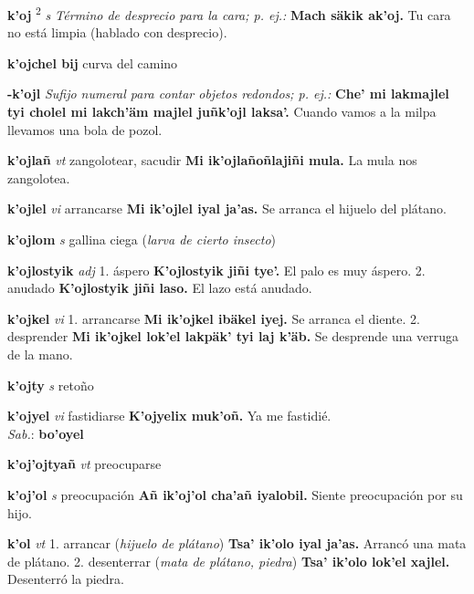 \documentclass[10pt]{scrbook}
\newcommand{\entry}[1]{\textbf{#1}}
\newcommand{\onedefinition}[1]{#1.}
\newcommand{\defsuperscript}[1]{\textsuperscript{#1}}
\newcommand{\nontranslationdef}[1]{\textit{#1}}
\newcommand{\partofspeech}[1]{\textit{#1}}
\newcommand{\spanishtranslation}[1]{#1}
\newcommand{\clarification}[1]{(\textit{#1})}
\newcommand{\cholexample}[1]{\textbf{#1}}
\newcommand{\exampletranslation}[1]{#1}
\newcommand{\dialectvariant}[1]{\\\textit{#1}:}
\newcommand{\dialectword}[1]{\textbf{#1}}
\begin{document}
\begin{multicols}{2}
\entry{k'oj}
\defsuperscript{2}
\partofspeech{s}
\nontranslationdef{Término de desprecio para la cara; p. ej.:}
\cholexample{Mach säkik ak'oj.}
\exampletranslation{Tu cara no está limpia (hablado con desprecio).}

\entry{k'ojchel bij}
\spanishtranslation{curva del camino}

\entry{-k'ojl}
\nontranslationdef{Sufijo numeral para contar objetos redondos; p. ej.:}
\cholexample{Che' mi lakmajlel tyi cholel mi lakch'äm majlel juñk'ojl laksa'.}
\exampletranslation{Cuando vamos a la milpa llevamos una bola de pozol.}

\entry{k'ojlañ}
\partofspeech{vt}
\spanishtranslation{zangolotear, sacudir}
\cholexample{Mi ik'ojlañoñlajiñi mula.}
\exampletranslation{La mula nos zangolotea.}

\entry{k'ojlel}
\partofspeech{vi}
\spanishtranslation{arrancarse}
\cholexample{Mi ik'ojlel iyal ja'as.}
\exampletranslation{Se arranca el hijuelo del plátano.}

\entry{k'ojlom}
\partofspeech{s}
\spanishtranslation{gallina ciega}
\clarification{larva de cierto insecto}

\entry{k'ojlostyik}
\partofspeech{adj}
\onedefinition{1}
\spanishtranslation{áspero}
\cholexample{K'ojlostyik jiñi tye'.}
\exampletranslation{El palo es muy áspero.}
\onedefinition{2}
\spanishtranslation{anudado}
\cholexample{K'ojlostyik jiñi laso.}
\exampletranslation{El lazo está anudado.}

\entry{k'ojkel}
\partofspeech{vi}
\onedefinition{1}
\spanishtranslation{arrancarse}
\cholexample{Mi ik'ojkel ibäkel iyej.}
\exampletranslation{Se arranca el diente.}
\onedefinition{2}
\spanishtranslation{desprender}
\cholexample{Mi ik'ojkel lok'el lakpäk' tyi laj k'äb.}
\exampletranslation{Se desprende una verruga de la mano.}

\entry{k'ojty}
\partofspeech{s}
\spanishtranslation{retoño}

\entry{k'ojyel}
\partofspeech{vi}
\spanishtranslation{fastidiarse}
\cholexample{K'ojyelix muk'oñ.}
\exampletranslation{Ya me fastidié.}
\dialectvariant{Sab.}
\dialectword{bo'oyel}

\entry{k'oj'ojtyañ}
\partofspeech{vt}
\spanishtranslation{preocuparse}

\entry{k'oj'ol}
\partofspeech{s}
\spanishtranslation{preocupación}
\cholexample{Añ ik'oj'ol cha'añ iyalobil.}
\exampletranslation{Siente preocupación por su hijo.}

\entry{k'ol}
\partofspeech{vt}
\onedefinition{1}
\spanishtranslation{arrancar}
\clarification{hijuelo de plátano}
\cholexample{Tsa' ik'olo iyal ja'as.}
\exampletranslation{Arrancó una mata de plátano.}
\onedefinition{2}
\spanishtranslation{desenterrar}
\clarification{mata de plátano, piedra}
\cholexample{Tsa' ik'olo lok'el xajlel.}
\exampletranslation{Desenterró la piedra.}


\end{multicols}
\end{document}

